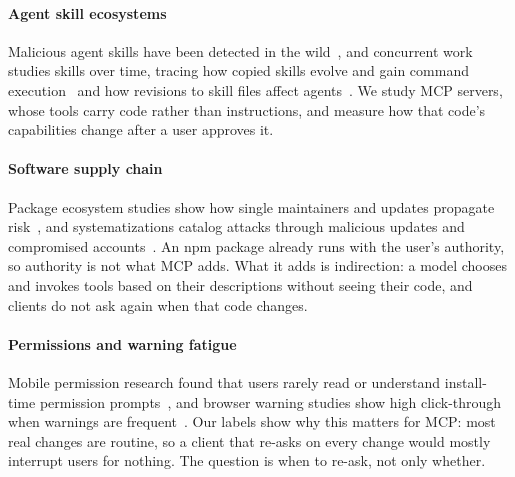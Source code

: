 \paragraph{Agent skill ecosystems}
Malicious agent skills have been detected in the wild~\cite{liu2026skills}, and concurrent work studies skills over time, tracing how copied skills evolve and gain command execution~\cite{skillconstellations2026} and how revisions to skill files affect agents~\cite{skillevolution2026}. We study MCP servers, whose tools carry code rather than instructions, and measure how that code's capabilities change after a user approves it.

\paragraph{Software supply chain}
Package ecosystem studies show how single maintainers and updates propagate risk~\cite{zimmermann2019npm}, and systematizations catalog attacks through malicious updates and compromised accounts~\cite{ladisa2023sok}. An npm package already runs with the user's authority, so authority is not what MCP adds. What it adds is indirection: a model chooses and invokes tools based on their descriptions without seeing their code, and clients do not ask again when that code changes.

\paragraph{Permissions and warning fatigue}
Mobile permission research found that users rarely read or understand install-time permission prompts~\cite{felt2012android}, and browser warning studies show high click-through when warnings are frequent~\cite{akhawe2013alice}. Our labels show why this matters for MCP: most real changes are routine, so a client that re-asks on every change would mostly interrupt users for nothing. The question is when to re-ask, not only whether.
